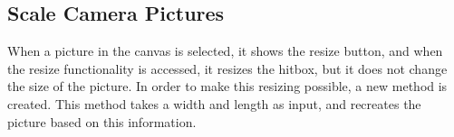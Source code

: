 \subsection{Scale Camera Pictures}
When a picture in the canvas is selected, it shows the resize button, and when the resize functionality is accessed, it resizes the hitbox, but it does not change the size of the picture. 
In order to make this resizing possible, a new method is created. 
This method takes a width and length as input, and recreates the picture based on this information.
